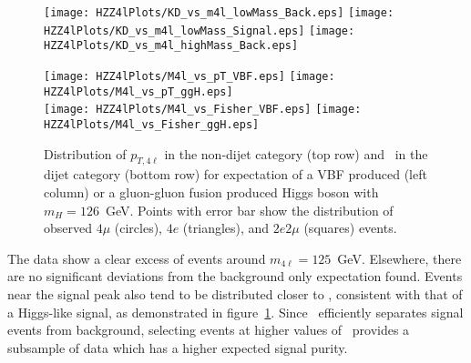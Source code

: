 \begin{figure}
\begin{center}
\texttt{[image: HZZ4lPlots/KD\_vs\_m4l\_lowMass\_Back.eps]}
\texttt{[image: HZZ4lPlots/KD\_vs\_m4l\_lowMass\_Signal.eps]}
\texttt{[image: HZZ4lPlots/KD\_vs\_m4l\_highMass\_Back.eps]}
\caption{
}
\label{fig:HZZ4lMassKDdist}
\end{center}
\end{figure}


\begin{figure}
\begin{center}
\texttt{[image: HZZ4lPlots/M4l\_vs\_pT\_VBF.eps]}
\texttt{[image: HZZ4lPlots/M4l\_vs\_pT\_ggH.eps]}\\
\texttt{[image: HZZ4lPlots/M4l\_vs\_Fisher\_VBF.eps]}
\texttt{[image: HZZ4lPlots/M4l\_vs\_Fisher\_ggH.eps]}
\caption{Distribution of $p_{T,4\ell}$ in the non-dijet category (top row) and 
\Djet~in the dijet category (bottom row) for expectation of a VBF produced (left column) 
or a gluon-gluon fusion produced Higgs boson with $m_H=126$~GeV.
Points with error bar show the distribution of observed $4\mu$ (circles), $4e$ (triangles), 
and $2e2\mu$ (squares) events.}
\label{fig:HZZ4lVBFvars}
\end{center}
\end{figure}

The data show a clear excess of events around $m_{4\ell}=125$~GeV. 
Elsewhere, there are no significant deviations from the 
background only expectation found.  
Events near the signal peak also tend to be distributed closer to 
, consistent with that of a Higgs-like signal, as demonstrated
in figure~\ref{fig:HZZ4lMassKDdist}. 
Since \KD~efficiently separates signal events from background,
selecting events at higher values of \KD~provides a subsample
of data which has a higher expected signal purity.


